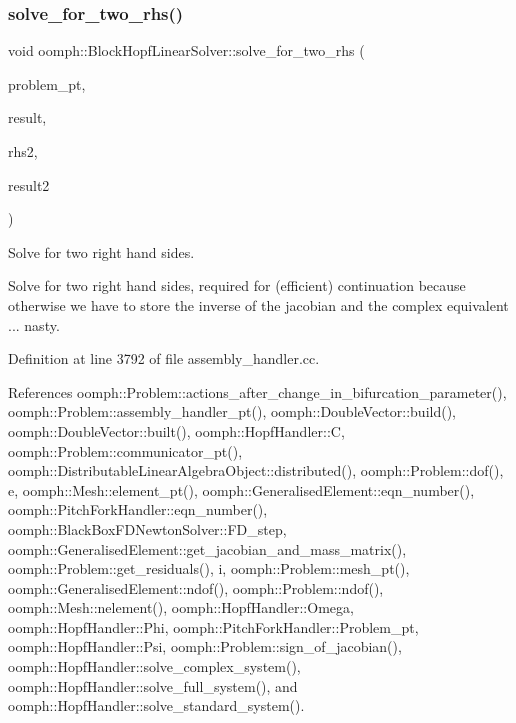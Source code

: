 \subsubsection{\texorpdfstring{solve\+\_\+for\+\_\+two\+\_\+rhs()}{solve\_for\_two\_rhs()}}
{\footnotesize\ttfamily void oomph\+::\+Block\+Hopf\+Linear\+Solver\+::solve\+\_\+for\+\_\+two\+\_\+rhs (\begin{DoxyParamCaption}\item[{\hyperlink{classoomph_1_1Problem}{Problem} $\ast$const \&}]{problem\+\_\+pt,  }\item[{\hyperlink{classoomph_1_1DoubleVector}{Double\+Vector} \&}]{result,  }\item[{const \hyperlink{classoomph_1_1DoubleVector}{Double\+Vector} \&}]{rhs2,  }\item[{\hyperlink{classoomph_1_1DoubleVector}{Double\+Vector} \&}]{result2 }\end{DoxyParamCaption})}



Solve for two right hand sides. 

Solve for two right hand sides, required for (efficient) continuation because otherwise we have to store the inverse of the jacobian and the complex equivalent ... nasty. 

Definition at line 3792 of file assembly\+\_\+handler.\+cc.



References oomph\+::\+Problem\+::actions\+\_\+after\+\_\+change\+\_\+in\+\_\+bifurcation\+\_\+parameter(), oomph\+::\+Problem\+::assembly\+\_\+handler\+\_\+pt(), oomph\+::\+Double\+Vector\+::build(), oomph\+::\+Double\+Vector\+::built(), oomph\+::\+Hopf\+Handler\+::C, oomph\+::\+Problem\+::communicator\+\_\+pt(), oomph\+::\+Distributable\+Linear\+Algebra\+Object\+::distributed(), oomph\+::\+Problem\+::dof(), e, oomph\+::\+Mesh\+::element\+\_\+pt(), oomph\+::\+Generalised\+Element\+::eqn\+\_\+number(), oomph\+::\+Pitch\+Fork\+Handler\+::eqn\+\_\+number(), oomph\+::\+Black\+Box\+F\+D\+Newton\+Solver\+::\+F\+D\+\_\+step, oomph\+::\+Generalised\+Element\+::get\+\_\+jacobian\+\_\+and\+\_\+mass\+\_\+matrix(), oomph\+::\+Problem\+::get\+\_\+residuals(), i, oomph\+::\+Problem\+::mesh\+\_\+pt(), oomph\+::\+Generalised\+Element\+::ndof(), oomph\+::\+Problem\+::ndof(), oomph\+::\+Mesh\+::nelement(), oomph\+::\+Hopf\+Handler\+::\+Omega, oomph\+::\+Hopf\+Handler\+::\+Phi, oomph\+::\+Pitch\+Fork\+Handler\+::\+Problem\+\_\+pt, oomph\+::\+Hopf\+Handler\+::\+Psi, oomph\+::\+Problem\+::sign\+\_\+of\+\_\+jacobian(), oomph\+::\+Hopf\+Handler\+::solve\+\_\+complex\+\_\+system(), oomph\+::\+Hopf\+Handler\+::solve\+\_\+full\+\_\+system(), and oomph\+::\+Hopf\+Handler\+::solve\+\_\+standard\+\_\+system().



